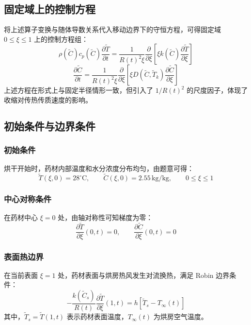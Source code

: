 \documentclass[withoutpreface,bwprint]{cumcm_thesis}
\begin{document}
\subsection{固定域上的控制方程}

将上述算子变换与随体导数关系代入移动边界下的守恒方程，可得固定域 \(0 \le \xi \le 1\) 上的控制方程组：
\begin{equation}
\rho(\tilde{C}) c_p(\tilde{C}) \frac{\partial \tilde{T}}{\partial t} = \frac{1}{R(t)^2 \xi} \frac{\partial}{\partial \xi} \left[ \xi k(\tilde{C}) \frac{\partial \tilde{T}}{\partial \xi} \right]
\end{equation}
\begin{equation}
\frac{\partial \tilde{C}}{\partial t} = \frac{1}{R(t)^2 \xi} \frac{\partial}{\partial \xi} \left[ \xi D(\tilde{C}, \tilde{T}_k) \frac{\partial \tilde{C}}{\partial \xi} \right]
\end{equation}
上述方程在形式上与固定半径情形一致，但引入了 \(1/R(t)^2\) 的尺度因子，体现了收缩对传热传质速度的影响。

\subsection{初始条件与边界条件}

\subsubsection{初始条件}
烘干开始时，药材内部温度和水分浓度分布均匀，由题意可得：
\begin{equation}
\tilde{T}(\xi,0) = 28^\circ\text{C}, \qquad \tilde{C}(\xi,0) = 2.55 \, \text{kg/kg}, \qquad 0 \le \xi \le 1
\end{equation}

\subsubsection{中心对称条件}
在药材中心 \(\xi=0\) 处，由轴对称性可知梯度为零：
\begin{equation}
\frac{\partial \tilde{T}}{\partial \xi}(0,t) = 0, \qquad \frac{\partial \tilde{C}}{\partial \xi}(0,t) = 0
\end{equation}

\subsubsection{表面热边界}
在当前表面 \(\xi=1\) 处，药材表面与烘房热风发生对流换热，满足 Robin 边界条件：
\begin{equation}
-\frac{k(\tilde{C}_s)}{R(t)} \frac{\partial \tilde{T}}{\partial \xi}(1,t) = h \left[ \tilde{T}_s - T_\infty(t) \right]
\end{equation}
其中，\(\tilde{T}_s = \tilde{T}(1,t)\) 表示药材表面温度，\(T_\infty(t)\) 为烘房空气温度。
\end{document}
